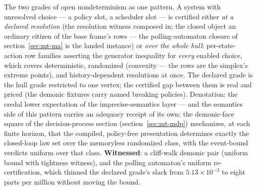 The two grades of open nondeterminism as one pattern. A system with
unresolved choice --- a policy slot, a scheduler slot --- is certified
either \emph{at a declared resolution} (the resolution witness
composed in; the closed object an ordinary citizen of the base
frame's rows --- the polling-automaton closure of
section~\ref{sec:mt-ma} is the landed instance) or \emph{over the
whole hull}: per-state-action row families asserting the generator
inequality for \emph{every} enabled choice, which covers
deterministic, randomized (convexity --- the rows are the simplex's
extreme points), and history-dependent resolutions at once. The
declared grade is the hull grade restricted to one vertex; the
certified gap between them is real and priced (the demonic fixtures
carry named breaking policies). Denotation: the credal lower
expectation of the imprecise-semantics layer --- and the semantics
side of this pattern carries an adequacy receipt of its own: the
demonic-face square of the decision-process section
(section~\ref{sec:mt-mdp}) mechanizes, at each finite horizon, that
the compiled, policy-free presentation determines exactly the
closed-loop law set over the memoryless randomized class, with the
event-bound verdicts uniform over that class. \textbf{Witnessed}: a
cliff-walk demonic pair (uniform bound with tightness witness), and
the polling automaton's uniform re-certification, which thinned the
declared grade's slack from $5.13 \times 10^{-3}$ to eight parts per
million without moving the bound.

